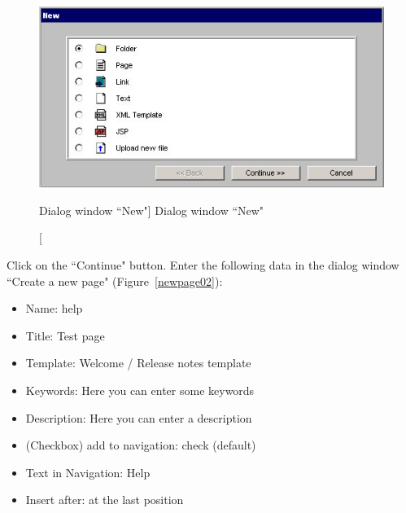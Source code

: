 \begin{figure}[!hbt]
\begin{center}
\includegraphics[width=\sgw]
                   {pics/usermanual/newPage01}
\caption[Dialog window ``New"]
           {Dialog window ``New"}
\label{newpage01}
\end{center}
\end{figure}

Click on the ``Continue" button. Enter the following data in the
dialog window ``Create a new page" (Figure~\ref{newpage02}):

\begin{itemize}
\item Name: help
\item Title: Test page
\item Template: Welcome / Release notes template
\item Keywords: Here you can enter some keywords
\item Description: Here you can enter a description
\item (Checkbox) add to navigation: check (default)
\item Text in Navigation: Help
\item Insert after: at the last position
\end{itemize}

